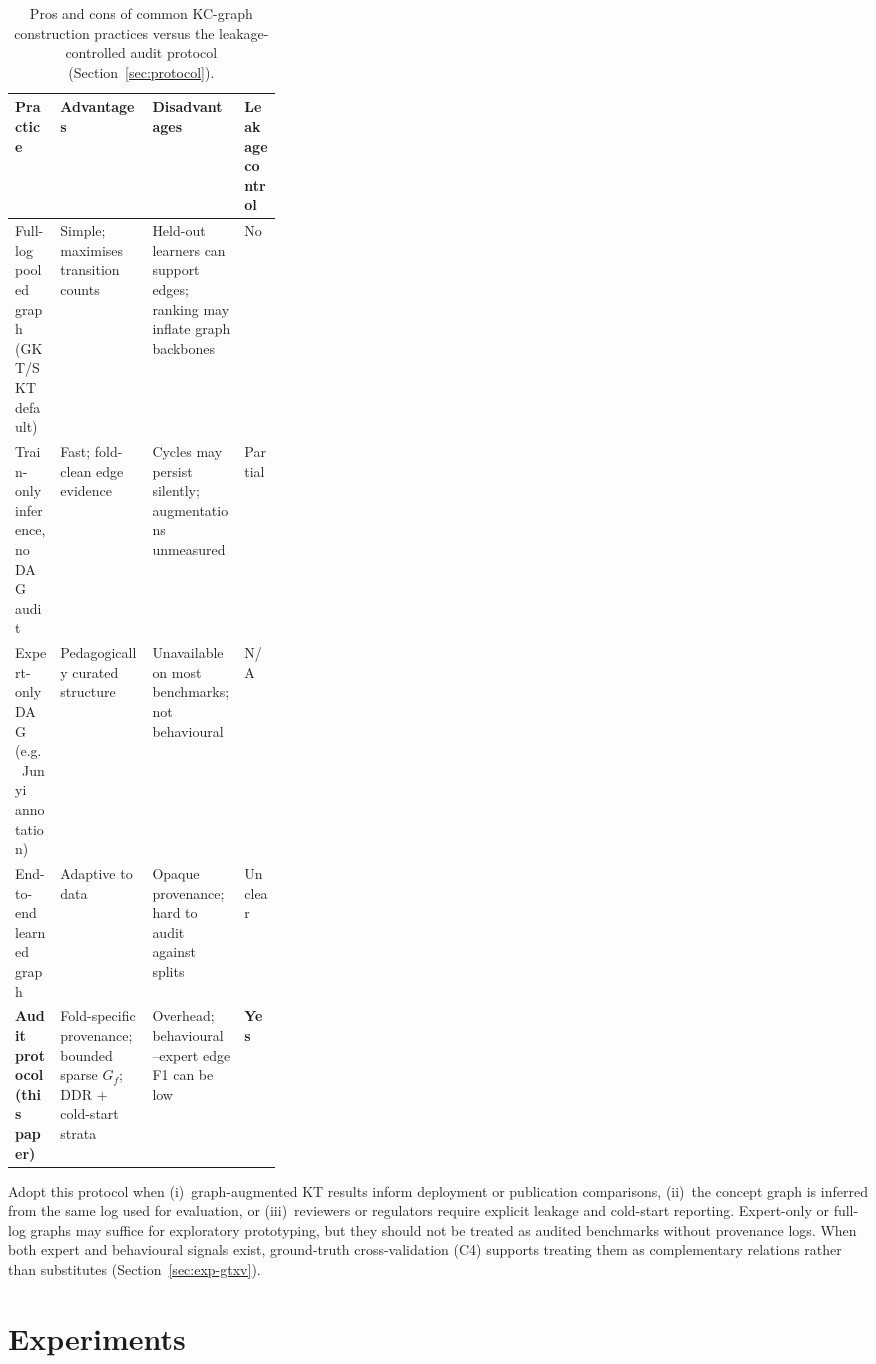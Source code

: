 \documentclass[pdflatex,sn-mathphys-num]{sn-jnl}
\newcommand{\DDR}{\textsc{DDR}}
\begin{document}
\begin{table}[t]
\centering
\caption{Pros and cons of common KC-graph construction practices versus
the leakage-controlled audit protocol (Section~\ref{sec:protocol}).}
\label{tab:protocol-comparison}
\footnotesize
\setlength{\tabcolsep}{3pt}
\begin{tabularx}{\linewidth}{@{} >{\RaggedRight\arraybackslash}p{0.17\linewidth} >{\RaggedRight\arraybackslash}X >{\RaggedRight\arraybackslash}X >{\RaggedRight\arraybackslash}p{0.14\linewidth} @{}}
\toprule
Practice & Advantages & Disadvantages & Leakage control \\
\midrule
Full-log pooled graph (GKT/SKT default) &
Simple; maximises transition counts &
Held-out learners can support edges; ranking may inflate graph backbones &
No \\
\midrule
Train-only inference, no DAG audit &
Fast; fold-clean edge evidence &
Cycles may persist silently; augmentations unmeasured &
Partial \\
\midrule
Expert-only DAG (e.g.\ Junyi annotation) &
Pedagogically curated structure &
Unavailable on most benchmarks; not behavioural &
N/A \\
\midrule
End-to-end learned graph &
Adaptive to data &
Opaque provenance; hard to audit against splits &
Unclear \\
\midrule
\textbf{Audit protocol (this paper)} &
Fold-specific provenance; bounded sparse $G_f$; \DDR{} + cold-start strata &
Overhead; behavioural--expert edge F1 can be low &
\textbf{Yes} \\
\bottomrule
\end{tabularx}
\end{table}

Adopt this protocol when (i)~graph-augmented KT results inform deployment
or publication comparisons, (ii)~the concept graph is inferred from the
same log used for evaluation, or (iii)~reviewers or regulators require
explicit leakage and cold-start reporting. Expert-only or full-log graphs
may suffice for exploratory prototyping, but they should not be treated as
audited benchmarks without provenance logs. When both expert and behavioural
signals exist, ground-truth cross-validation (C4) supports treating them as
complementary relations rather than substitutes (Section~\ref{sec:exp-gtxv}).
\section{Experiments}
\label{sec:exp}
\end{document}
